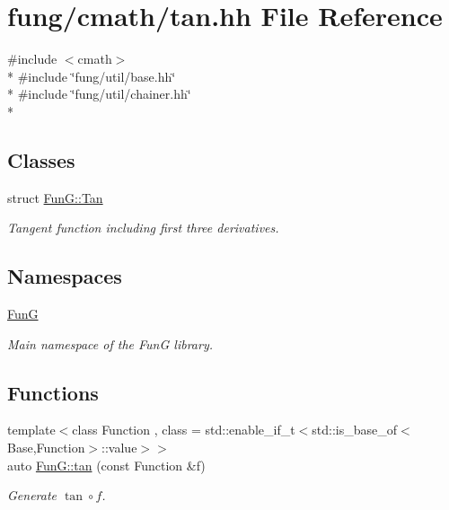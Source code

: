 \hypertarget{tan_8hh}{}\section{fung/cmath/tan.hh File Reference}
\label{tan_8hh}
{\ttfamily \#include $<$cmath$>$}\\*
{\ttfamily \#include \char`\"{}fung/util/base.\+hh\char`\"{}}\\*
{\ttfamily \#include \char`\"{}fung/util/chainer.\+hh\char`\"{}}\\*
\subsection*{Classes}
\begin{DoxyCompactItemize}
\item 
struct \hyperlink{structFunG_1_1Tan}{Fun\+G\+::\+Tan}
\begin{DoxyCompactList}\small\item\em Tangent function including first three derivatives. \end{DoxyCompactList}\end{DoxyCompactItemize}
\subsection*{Namespaces}
\begin{DoxyCompactItemize}
\item 
 \hyperlink{namespaceFunG}{Fun\+G}
\begin{DoxyCompactList}\small\item\em Main namespace of the Fun\+G library. \end{DoxyCompactList}\end{DoxyCompactItemize}
\subsection*{Functions}
\begin{DoxyCompactItemize}
\item 
{\footnotesize template$<$class Function , class  = std\+::enable\+\_\+if\+\_\+t$<$std\+::is\+\_\+base\+\_\+of$<$\+Base,\+Function$>$\+::value$>$$>$ }\\auto \hyperlink{group__CMathGroup_gae03f57bd4efb4449ad1dc60cb74c742d}{Fun\+G\+::tan} (const Function \&f)
\begin{DoxyCompactList}\small\item\em Generate $ \tan\circ f $. \end{DoxyCompactList}\end{DoxyCompactItemize}
